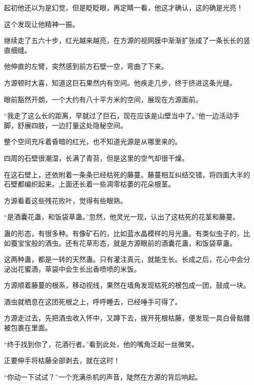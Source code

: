 \begin{this_body}
起初他还以为是幻觉，但是眨眨眼，再定睛一看，他这才确认，这的确是光亮！

这个发现让他精神一振。

继续走了五六十步，红光越来越亮，在方源的视网膜中渐渐扩张成了一条长长的竖直细缝。

他伸直的左臂，突然感到前方石壁一空，弯曲了下来。

方源顿时大喜，知道这巨石果然内有空间。他疾走几步，终于挤进这条光缝。

眼前豁然开朗，一个大约有八十平方米的空间，展现在方源面前。

“我走了这么长的距离，早就过了巨石，现在应该是山壁当中了。”他一边活动手脚，舒展四肢，一边打量这处隐秘空间。

整个空间充斥着昏暗的红光，也不知道光源是从哪里来的。

四周的石壁很潮湿，长满了青苔，但是这里的空气却很干燥。

在这石壁上，还依附着一条条已经枯死的藤蔓。藤蔓相互纠结交错，将四面大半的石壁都编织起来。上面还长着一些凋零枯萎的花朵根茎。

方源看着这些残花败叶，觉得有些眼熟。

“是酒囊花蛊，和饭袋草蛊。”忽然，他灵光一现，认出了这枯死的花茎和藤蔓。

蛊的形态，有很多种。有像矿石的，比如蓝水晶模样的月光蛊。有类似虫子的，比如蚕宝宝般的酒虫。还有花草形态，就是方源眼前的酒囊花蛊，和饭袋草蛊。

这两种蛊，都是一转的天然蛊。只有灌注真元，就能生长。长成之后，花心中会分泌出花蜜酒，草袋中会生长出香喷喷的米饭。

方源顺着藤蔓的根系，移动视线，果然在墙角发现枯死的根包成一团，鼓成一块。

酒虫就栖息在这团死根之上，呼呼睡去，已经唾手可得了。

方源走过去，先把酒虫收入怀中，又蹲下去，拨开死根枯藤，便发现一具白骨骷髅被包裹在里面。

“终于找到你了，花酒行者。”看到此处，他的嘴角泛起一丝微笑。

正要伸手将枯藤全部剥去，就在这时！

“你动一下试试？”一个充满杀机的声音，陡然在方源的背后响起。

\end{this_body}

